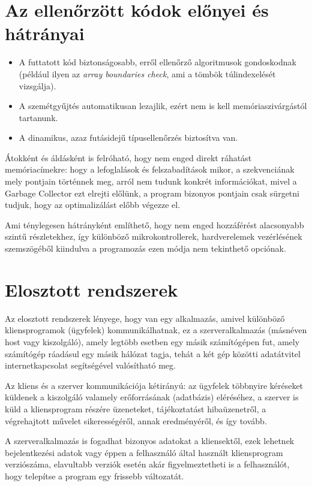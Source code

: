 \documentclass[tocnopagenum]{thesis-ekf}
\begin{document}
	\section{Az ellenőrzött kódok előnyei és hátrányai}
	\begin{itemize}
		\item A futtatott kód biztonságosabb, erről ellenőrző algoritmusok gondoskodnak (például ilyen az \textit{array boundaries check}, ami a tömbök túlindexelését vizsgálja).
		\item A szemétgyűjtés automatikusan lezajlik, ezért nem is kell memóriaszivárgástól tartanunk.
		\item A dinamikus, azaz futásidejű típusellenőrzés biztosítva van.
	\end{itemize}
	
	Átokként és áldásként is felróható, hogy nem enged direkt ráhatást memóriacímekre: hogy a lefoglalások és felszabadítások mikor, a szekvenciának mely pontjain történnek meg, arról nem tudunk konkrét információkat, mivel a Garbage Collector ezt elrejti előlünk, a program bizonyos pontjain csak sürgetni tudjuk, hogy az optimalizálást előbb végezze el. 
	
	Ami ténylegesen hátrányként említhető, hogy nem enged hozzáférést alacsonyabb szintű részletekhez, így különböző mikrokontrollerek, hardverelemek vezérlésének szemszögéből kiindulva a programozás ezen módja nem tekinthető opciónak.
	\section{Elosztott rendszerek}
	Az elosztott rendszerek lényege, hogy van egy alkalmazás, amivel különböző kliensprogramok (ügyfelek) kommunikálhatnak, ez a szerveralkalmazás (másnéven host vagy kiszolgáló), amely legtöbb esetben egy másik számítógépen fut, amely számítógép ráadásul egy másik hálózat tagja, tehát a két gép közötti adatátvitel internetkapcsolat segítségével valósítható meg. 
	
	Az kliens és a szerver kommunikációja kétirányú: az ügyfelek többnyire kéréseket küldenek a kiszolgáló valamely erőforrásának (adatbázis) eléréséhez, a szerver is küld a kliensprogram részére üzeneteket, tájékoztatást hibaüzenetről, a végrehajtott művelet sikerességéről, annak eredményéről, és így tovább. 
	
	A szerveralkalmazás is fogadhat bizonyos adatokat a kliensektől, ezek lehetnek bejelentkezési adatok vagy éppen a felhasználó által használt kliensprogram verziószáma, elavultabb verziók esetén akár figyelmeztetheti is a felhasználót, hogy telepítse a program egy frissebb változatát. \cite{client_server}
	
\end{document}
